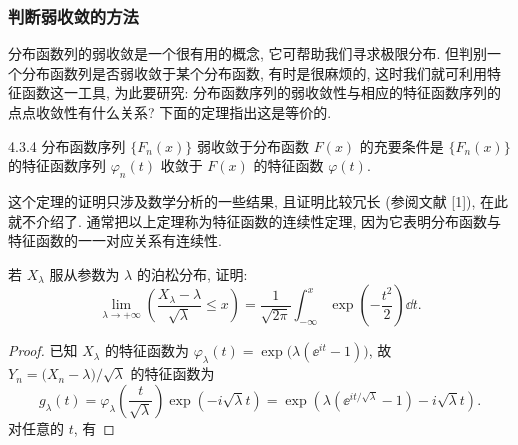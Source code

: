 \subsubsection{判断弱收敛的方法}

分布函数列的弱收敛是一个很有用的概念, 它可帮助我们寻求极限分布.
但判别一个分布函数列是否弱收敛于某个分布函数, 有时是很麻烦的, 这时我们就可利用特征函数这一工具, 为此要研究: 分布函数序列的弱收敛性与相应的特征函数序列的点点收敛性有什么关系?
下面的定理指出这是等价的.

\begin{theorem}{}{4.3.4}
    分布函数序列 $ \{ F_n (x) \} $ 弱收敛于分布函数 $ F (x) $ 的充要条件是 $ \{ F_n (x) \} $ 的特征函数序列 $ \varphi_n (t) $ 收敛于 $ F (x) $ 的特征函数 $ \varphi (t) $.
\end{theorem}

这个定理的证明只涉及数学分析的一些结果, 且证明比较冗长 (参阅文献
[1]), 在此就不介绍了.
通常把以上定理称为特征函数的连续性定理, 因为它表明分布函数与特征函数的一一对应关系有连续性.

\begin{example}\label{exam:4.3.3}
    若 $ X_\lambda $ 服从参数为 $ \lambda $ 的泊松分布, 证明:
    \begin{equation*}
        \lim_{\lambda \to +\infty} \left( \frac{X_\lambda - \lambda}{\sqrt{\lambda}} \leq x \right) = \frac{1}{\sqrt{2\pi}} \int_{-\infty}^x \exp \left( - \frac{t^2}{2} \right) \dd t.
    \end{equation*}
\end{example}

\begin{proof}
    已知 $ X_\lambda $ 的特征函数为 $ \varphi_\lambda (t) = \exp \bigl( \lambda ( \ee^{it} - 1 ) \bigr) $, 故 $ Y_n = \bigl( X_n - \lambda \bigr) / \sqrt{\lambda} $ 的特征函数为
    \begin{equation*}
        g_\lambda (t) = \varphi_\lambda \left( \frac{t}{\sqrt{\lambda}} \right) \exp \left( -i \sqrt{\lambda} t \right) = \exp \left( \lambda \left( \ee^{i t / \sqrt{\lambda}} - 1 \right) - i \sqrt{\lambda} t \right).
    \end{equation*}
    对任意的 $ t $, 有
\end{proof}
